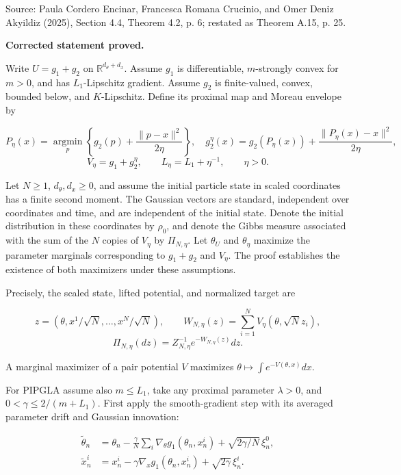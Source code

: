 \documentclass[11pt,a4paper]{report}
\begin{document}
Source: Paula Cordero Encinar, Francesca Romana Crucinio, and Omer Deniz Akyildiz (2025), Section 4.4, Theorem 4.2, p. 6; restated as Theorem A.15, p. 25.



\textbf{Corrected statement proved.}



Write \(U=g_1+g_2\) on \(\mathbb R^{d_\theta+d_x}\). Assume \(g_1\) is differentiable, \(m\)-strongly convex for \(m>0\), and has \(L_1\)-Lipschitz gradient. Assume \(g_2\) is finite-valued, convex, bounded below, and \(K\)-Lipschitz. Define its proximal map and Moreau envelope by


\[P_\eta(x)=\operatorname*{argmin}_p\left\{g_2(p)+\frac{\|p-x\|^2}{2\eta}\right\},\quad
g_2^\eta(x)=g_2(P_\eta(x))+\frac{\|P_\eta(x)-x\|^2}{2\eta},\]
\[V_\eta=g_1+g_2^\eta,\qquad L_\eta=L_1+\eta^{-1},\qquad\eta>0.\]


Let \(N\ge1\), \(d_\theta,d_x\ge0\), and assume the initial particle state in scaled coordinates has a finite second moment. The Gaussian vectors are standard, independent over coordinates and time, and are independent of the initial state. Denote the initial distribution in these coordinates by \(\rho_0\), and denote the Gibbs measure associated with the sum of the \(N\) copies of \(V_\eta\) by \(\Pi_{N,\eta}\). Let \(\theta_U\) and \(\theta_\eta\) maximize the parameter marginals corresponding to \(g_1+g_2\) and \(V_\eta\). The proof establishes the existence of both maximizers under these assumptions.



Precisely, the scaled state, lifted potential, and normalized target are


\[z=(\theta,x^1/\sqrt N,\ldots,x^N/\sqrt N),\qquad
W_{N,\eta}(z)=\sum_{i=1}^N V_\eta(\theta,\sqrt N z_i),\]
\[\Pi_{N,\eta}(dz)=Z_{N,\eta}^{-1}e^{-W_{N,\eta}(z)}dz.\]


A marginal maximizer of a pair potential \(V\) maximizes \(\theta\mapsto\int e^{-V(\theta,x)}dx\).



For PIPGLA assume also \(m\le L_1\), take any proximal parameter \(\lambda>0\), and \(0<\gamma\le2/(m+L_1)\). First apply the smooth-gradient step with its averaged parameter drift and Gaussian innovation:


\[\begin{aligned}
\widetilde\theta_n&=\theta_n-\frac\gamma N\sum_i\nabla_\theta g_1(\theta_n,x_n^i)+\sqrt{2\gamma/N}\,\xi_n^0,\\
\widetilde x_n^i&=x_n^i-\gamma\nabla_x g_1(\theta_n,x_n^i)+\sqrt{2\gamma}\,\xi_n^i.
\end{aligned}\]
\end{document}
